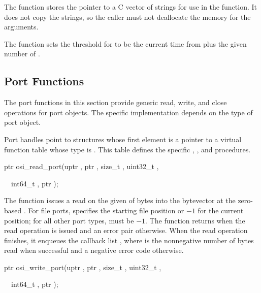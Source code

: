 The  function stores the  pointer to a
C vector of  strings for use in the 
function. It does not copy the strings, so the caller must not
deallocate the memory for the arguments.

\begin{function}
\end{function}

The  function sets the threshold for
 to be the current time from
 plus the given number of .

\subsection {Port Functions}

The port functions in this section provide generic read, write, and
close operations for port objects. The specific implementation depends
on the type of port object.

Port handles point to structures whose first element is a pointer to a
virtual function table whose type is . This
table defines the specific , , and 
procedures.

\begin{function}
\codebegin
ptr osi\_read\_port(uptr , ptr , size\_t , uint32\_t ,\strut
       \     \      int64\_t , ptr );\strut
\codeend
\end{function}

The  function issues a read on the given
 of  bytes into the bytevector  at the
zero-based . For file ports,  specifies
the starting file position or $-1$ for the current position; for all
other port types,  must be $-1$.  The function returns
 when the read operation is issued and an error pair
otherwise. When the read operation finishes, it enqueues the callback
list , where  is the
nonnegative number of bytes read when successful and a negative error
code otherwise.

\begin{function}
\codebegin
ptr osi\_write\_port(uptr , ptr , size\_t , uint32\_t ,\strut
       \      \      int64\_t , ptr );\strut
\codeend\end{function}

